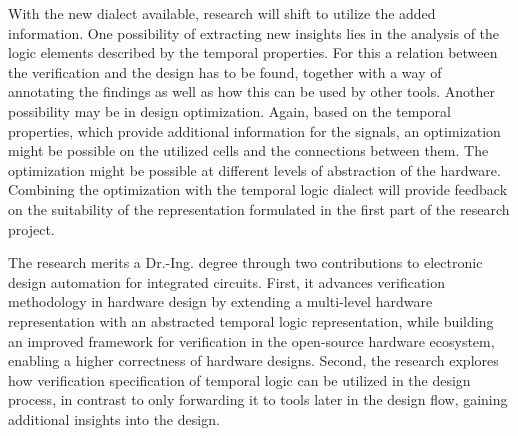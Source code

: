 \documentclass[11pt,DIV=16,parskip=half]{scrartcl}
\begin{document}
With the new dialect available, research will shift to utilize the added
information.
One possibility of extracting new insights lies in the analysis of the logic
elements described by the temporal properties.
For this a relation between the verification and the design has to be found,
together with a way of annotating the findings as well as how this can be used
by other tools.
Another possibility may be in design optimization.
Again, based on the temporal properties, which provide additional information
for the signals, an optimization might be possible on the utilized cells and
the connections between them.
The optimization might be possible at different levels of abstraction of the hardware.
Combining the optimization with the temporal logic dialect will provide
feedback on the suitability of the representation formulated in the first part
of the research project.

The research merits a Dr.-Ing. degree through two contributions to electronic
design automation for integrated circuits.
First, it advances verification methodology in hardware design by extending a
multi-level hardware representation with an abstracted temporal logic
representation, while building an improved framework for verification in the
open-source hardware ecosystem, enabling a higher correctness of hardware
designs.
Second, the research explores how verification specification of temporal logic
can be utilized in the design process, in contrast to only forwarding it to
tools later in the design flow, gaining additional insights into the design.
\end{document}
